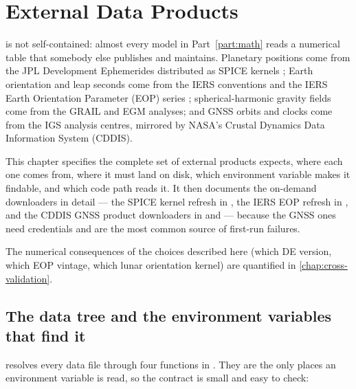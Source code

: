 \chapter{External Data Products}
\label{chap:sp3-download}

\lupnt{} is not self-contained: almost every model in
Part~\ref{part:math} reads a numerical table that somebody else publishes and
maintains. Planetary positions come from the JPL Development Ephemerides
\citep{park2021de440} distributed as SPICE kernels \citep{acton1996spice};
Earth orientation and leap seconds come from the IERS conventions and the IERS
Earth Orientation Parameter (EOP) series \citep{iers2010}; spherical-harmonic
gravity fields come from the GRAIL and EGM analyses; and GNSS orbits and
clocks come from the IGS analysis centres, mirrored by NASA's Crustal Dynamics
Data Information System (CDDIS).

This chapter specifies the complete set of external products \lupnt{} expects,
where each one comes from, where it must land on disk, which environment
variable makes it findable, and which code path reads it. It then documents
the on-demand downloaders in detail --- the SPICE kernel refresh in
, the IERS EOP refresh in
, and the CDDIS GNSS product downloaders in
 and
 --- because the GNSS ones need
credentials and are the most common source of first-run failures.

The numerical consequences of the choices described here (which DE version,
which EOP vintage, which lunar orientation kernel) are quantified in
\cref{chap:cross-validation}.

\section{The data tree and the environment variables that find it}
\label{sec:sp3-data-tree}

\lupnt{} resolves every data file through four functions in
. They are the only places an environment
variable is read, so the contract is small and easy to check:

